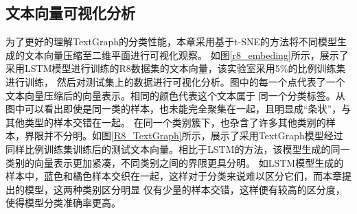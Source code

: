 \subsection{文本向量可视化分析}
为了更好的理解TextGraph的分类性能，本章采用基于t-SNE的方法将不同模型生成的文本向量压缩至二维平面进行可视化观察。
如图\ref{r8_embeding}所示，展示了采用LSTM模型进行训练的R8数据集的文本向量，该实验室采用5\%的比例训练集进行训练，
然后对测试集上的数据进行可视化分析。图中的每一个点代表了一个文本向量压缩后的向量表示。相同的颜色代表这个文本属于
同一个分类标签。从图中可以看出即使是同一类的样本，也未能完全聚集在一起，且明显成“条状”，与其他类型的样本交错在一起。
在同一个类别簇下，也杂含了许多其他类别的样本，界限并不分明。如图\ref{R8_TextGraph}所示，展示了采用TextGraph模型经过
同样比例训练集训练后的测试文本向量。相比于LSTM的方法，该模型生成的同一类别的向量表示更加紧凑，不同类别之间的界限更具分明。
如LSTM模型生成的样本中，蓝色和橘色样本交织在一起，这样对于分类来说难以区分它们，而本章提出的模型，这两种类别区分明显
仅有少量的样本交错，这样便有较高的区分度，使得模型分类准确率更高。

